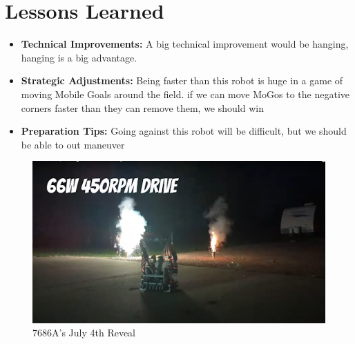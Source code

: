 \section*{Lessons Learned}
\begin{itemize}
    \item \textbf{Technical Improvements:} A big technical improvement would be hanging, hanging is a big advantage. 
    \item \textbf{Strategic Adjustments:} Being faster than this robot is huge in a game of moving Mobile Goals around the field. if we can move MoGos to the negative corners faster than they can remove them, we should win
    \item \textbf{Preparation Tips:} Going against this robot will be difficult, but we should be able to out maneuver 
\end{itemize}
\begin{figure}[h!]
    \centering
    \includegraphics[width=1\linewidth]{images/7686A Independance Day.png}
    \caption{7686A's July 4th Reveal}
    \label{fig:7686A}
\end{figure}



